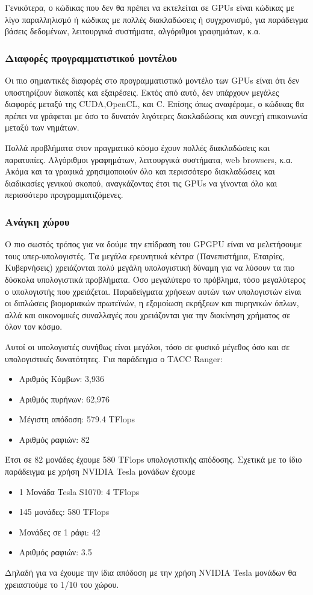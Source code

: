 Γενικότερα, ο κώδικας που δεν θα πρέπει να εκτελείται σε GPUs είναι κώδικας με λίγο παραλληλισμό ή κώδικας με πολλές διακλαδώσεις ή συγχρονισμό, για παράδειγμα βάσεις δεδομένων, λειτουργικά συστήματα, αλγόριθμοι γραφημάτων, κ.α.
\subsubsection{Διαφορές προγραμματιστικού μοντέλου}
Οι πιο σημαντικές διαφορές στο προγραμματιστικό μοντέλο των GPUs είναι ότι δεν υποστηρίζουν διακοπές και εξαιρέσεις. Εκτός από αυτό, δεν υπάρχουν μεγάλες διαφορές μεταξύ της CUDA,OpenCL, και C. Επίσης όπως αναφέραμε, ο κώδικας θα πρέπει να γράφεται με όσο το δυνατόν λιγότερες διακλαδώσεις και συνεχή επικοινωνία μεταξύ των νημάτων.

Πολλά προβλήματα στον πραγματικό κόσμο έχουν πολλές διακλαδώσεις και παρατυπίες. Αλγόριθμοι γραφημάτων, λειτουργικά συστήματα, web browsers, κ.α. Ακόμα και τα γραφικά χρησιμοποιούν όλο και περισσότερο διακλαδώσεις και διαδικασίες γενικού σκοπού, αναγκάζοντας έτσι τις GPUs να γίνονται όλο και περισσότερο προγραμματιζόμενες.


\subsubsection{Ανάγκη χώρου}
Ο πιο σωστός τρόπος για να δούμε την επίδραση του GPGPU είναι να μελετήσουμε τους υπερ-υπολογιστές. Τα μεγάλα ερευνητικά κέντρα (Πανεπιστήμια, Εταιρίες, Κυβερνήσεις) χρειάζονται πολύ μεγάλη υπολογιστική δύναμη για να λύσουν τα πιο δύσκολα υπολογιστικά προβλήματα. Όσο μεγαλύτερο το πρόβλημα, τόσο μεγαλύτερος ο υπολογιστής που χρειάζεται. Παραδείγματα χρήσεων αυτών των υπολογιστών είναι οι διπλώσεις βιομοριακών πρωτεϊνών, η εξομοίωση εκρήξεων και πυρηνικών όπλων, αλλά και οικονομικές συναλλαγές που χρειάζονται για την διακίνηση χρήματος σε όλον τον κόσμο.

Αυτοί οι υπολογιστές συνήθως είναι μεγάλοι, τόσο σε φυσικό μέγεθος όσο και σε υπολογιστικές δυνατότητες. Για παράδειγμα ο TACC Ranger:
\begin{itemize}
\item Αριθμός Κόμβων: 3,936
\item Αριθμός πυρήνων: 62,976
\item Μέγιστη απόδοση: 579.4 TFlops
\item Αριθμός ραφιών: 82
\end{itemize}

Έτσι σε 82 μονάδες έχουμε 580 TFlops υπολογιστικής απόδοσης. Σχετικά με το ίδιο παράδειγμα με χρήση NVIDIA Tesla μονάδων έχουμε
\begin{itemize}
\item 1 Μονάδα Tesla S1070: 4 TFlops
\item 145 μονάδες: 580 TFlops
\item Μονάδες σε 1 ράφι: 42
\item Αριθμός ραφιών: 3.5
\end{itemize}
Δηλαδή για να έχουμε την ίδια απόδοση με την χρήση NVIDIA Tesla μονάδων θα χρειαστούμε το 1/10 του χώρου.

